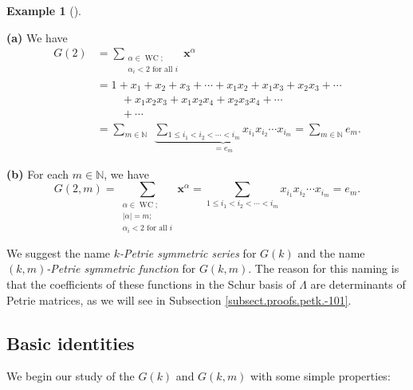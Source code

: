 \documentclass[numbers=enddot,12pt,final,onecolumn,notitlepage]{scrartcl}%
\theoremstyle{definition}
\newtheorem{exam}[theo]{Example}
\newenvironment{example}[1][]
{\begin{exam}[#1]\begin{leftbar}}
{\end{leftbar}\end{exam}}
\let\sumnonlimits\sum
\renewcommand{\sum}{\sumnonlimits\limits}
\begin{document}
\begin{example}
\textbf{(a)} We have%
\begin{align*}
G\left(  2\right)   &  =\sum_{\substack{\alpha\in\operatorname*{WC}%
;\\\alpha_{i}<2\text{ for all }i}}\mathbf{x}^{\alpha}\\
&  =1+x_{1}+x_{2}+x_{3}+\cdots+x_{1}x_{2}+x_{1}x_{3}+x_{2}x_{3}+\cdots\\
&  \ \ \ \ \ \ \ \ \ \ +x_{1}x_{2}x_{3}+x_{1}x_{2}x_{4}+x_{2}x_{3}x_{4}%
+\cdots\\
&  \ \ \ \ \ \ \ \ \ \ +\cdots\\
&  =\sum_{m\in\mathbb{N}}\ \ \underbrace{\sum_{1\leq i_{1}<i_{2}<\cdots<i_{m}%
}x_{i_{1}}x_{i_{2}}\cdots x_{i_{m}}}_{=e_{m}}=\sum_{m\in\mathbb{N}}e_{m}.
\end{align*}


\textbf{(b)} For each $m\in\mathbb{N}$, we have%
\[
G\left(  2,m\right)  =\sum_{\substack{\alpha\in\operatorname*{WC};\\\left\vert
\alpha\right\vert =m;\\\alpha_{i}<2\text{ for all }i}}\mathbf{x}^{\alpha}%
=\sum_{1\leq i_{1}<i_{2}<\cdots<i_{m}}x_{i_{1}}x_{i_{2}}\cdots x_{i_{m}}%
=e_{m}.
\]

\end{example}

We suggest the name $k$\emph{-Petrie symmetric series} for $G\left(  k\right)
$ and the name $\left(  k,m\right)  $\emph{-Petrie symmetric function} for
$G\left(  k,m\right)  $. The reason for this naming is that the coefficients
of these functions in the Schur basis of $\Lambda$ are determinants of Petrie
matrices, as we will see in Subsection \ref{subsect.proofs.petk.-101}.

\subsection{\label{subsect.petk.basics}Basic identities}

We begin our study of the $G\left(  k\right)  $ and $G\left(  k,m\right)  $
with some simple properties:
\end{document}
